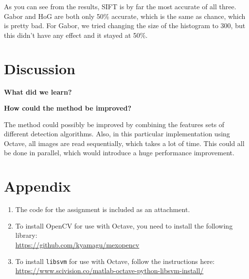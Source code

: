 \documentclass{article}
\begin{document}
  As you can see from the results, SIFT is by far the most accurate of all three. Gabor and HoG are both only 50\% accurate, which is the same as chance, which is pretty bad. For Gabor, we tried changing the size of the histogram to 300, but this didn't have any effect and it stayed at 50\%.

  \newpage

  \section{Discussion}

  \textbf{What did we learn?}

  \textbf{How could the method be improved?}

  The method could possibly be improved by combining the features sets of different detection algorithms. Also, in this particular implementation using Octave, all images are read sequentially, which takes a lot of time. This could all be done in parallel, which would introduce a huge performance improvement.

  \newpage

  \section{Appendix}

  \begin{enumerate}
    \item The code for the assignment is included as an attachment.
    \item To install OpenCV for use with Octave, you need to install the following library:\\
          \url{https://github.com/kyamagu/mexopencv}
    \item To install \texttt{libsvm} for use with Octave, follow the instructions here:\\
          \url{https://www.scivision.co/matlab-octave-python-libsvm-install/}
  \end{enumerate}
\end{document}
